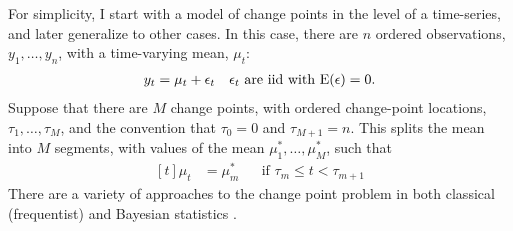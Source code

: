 For simplicity, I start with a model of change points in the level of a time-series, and later generalize to other cases.
In this case, there are $n$ ordered observations, $y_{1}, \dots, y_{n}$, with a time-varying mean, $\mu_{t}$:
\begin{equation}
  \label{dlm:eq:17}
  \begin{aligned}[t]
    y_{t} & = \mu_{t} + \epsilon_{t} && \text{$\epsilon_{t}$ are iid with $\operatorname{E}(\epsilon) = 0$.} \\  
  \end{aligned}
\end{equation}
Suppose that there are $M$ change points, with ordered change-point locations, $\tau_{1}, \dots, \tau_{M}$, and the convention that $\tau_{0} = 0$ and $\tau_{M + 1} = n$.
This splits the mean into $M$ segments, with values of the mean $\mu^{*}_{1}, \dots, \mu^{*}_{M}$,  such that
\begin{equation}
  \label{dlm:eq:1}
  \begin{aligned}[t]
    \mu_{t} &= \mu^{*}_{m} && \text{if $\tau_{m} \leq t < \tau_{m + 1}$}
  \end{aligned}
\end{equation}
There are a variety of approaches to the change point problem in both classical (frequentist) \parencites{Page1954a}{Hinkley1970a}{BaiPerron2003a}{OlshenVenkatramanLucitoEtAl2004}{BaiPerron1998}{KillickFearnheadEckley2012} and Bayesian statistics \parencites{Yao1984}{BarryHartigan1993}{Chib1998}{Fearnhead2006a}{FearnheadLiu2007a}.

